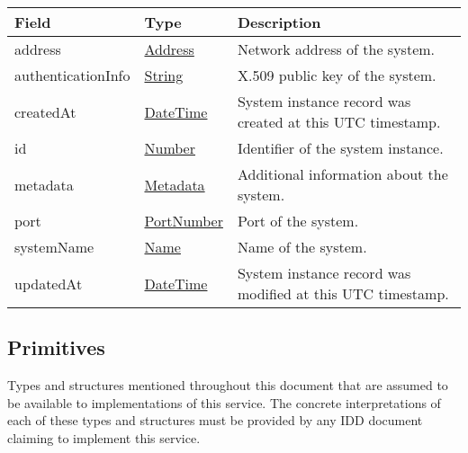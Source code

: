 \documentclass[a4paper]{arrowhead}
\newcommand{\pref}[1]{{\textcolor{ArrowheadGrey}{\hyperref[sec:model:primitives:#1]{#1}}}}
\begin{document}
\label{sec:model:SystemRecord}

\begin{table}[ht!]
\begin{tabularx}{\textwidth}{| p{4.25cm} | p{3.5cm} | X |} \hline
\rowcolor{gray!33} Field & Type & Description \\ \hline

address &\pref{Address} & Network address of the system. \\ \hline
authenticationInfo &\pref{String} & X.509 public key of the system. \\ \hline
createdAt & \pref{DateTime} & System instance record was created at this UTC time\-stamp. \\ \hline
id & \pref{Number} & Identifier of the system instance. \\ \hline
metadata &\hyperref[sec:model:Metadata]{Metadata} & Additional information about the system. \\ \hline
port &\pref{PortNumber} & Port of the system. \\ \hline
systemName &\pref{Name} & Name of the system. \\ \hline
updatedAt & \pref{DateTime} & System instance record was modified at this UTC time\-stamp. \\ \hline
\end{tabularx}
\end{table}

\subsection{Primitives}
\label{sec:model:primitives}

Types and structures mentioned throughout this document that are assumed to be available to implementations of this service.
The concrete interpretations of each of these types and structures must be provided by any IDD document claiming to implement this service.
\end{document}
